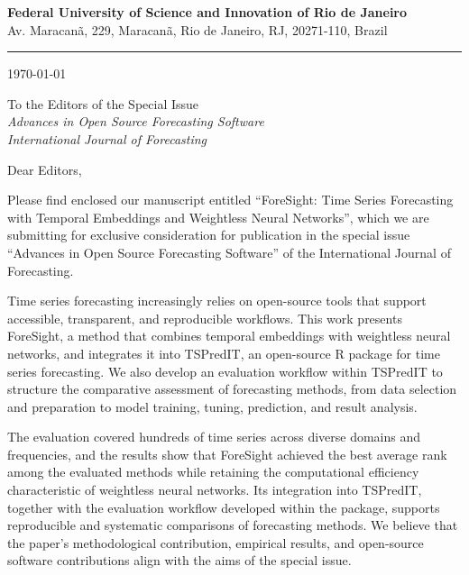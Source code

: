 \documentclass[11pt,a4paper]{article}
\begin{document}
\begin{center}
    {\large\bfseries Federal University of Science and Innovation of Rio de Janeiro}\\
    {\normalsize Av. Maracan\~a, 229, Maracan\~a, Rio de Janeiro, RJ, 20271-110, Brazil}
\end{center}
\vspace{-0.5em}
\noindent\rule{\linewidth}{0.8pt}

\vspace{1.0em}
\hfill \today

\vspace{1.0em}
\noindent To the Editors of the Special Issue\\
\noindent \emph{Advances in Open Source Forecasting Software}\\
\noindent \emph{International Journal of Forecasting}

\vspace{1.0em}

\noindent Dear Editors,

\noindent Please find enclosed our manuscript entitled ``ForeSight: Time Series Forecasting with Temporal Embeddings and Weightless Neural Networks'', which we are submitting for exclusive consideration for publication in the special issue ``Advances in Open Source Forecasting Software'' of the International Journal of Forecasting.

Time series forecasting increasingly relies on open-source tools that support accessible, transparent, and reproducible workflows. This work presents ForeSight, a method that combines temporal embeddings with weightless neural networks, and integrates it into TSPredIT, an open-source R package for time series forecasting. We also develop an evaluation workflow within TSPredIT to structure the comparative assessment of forecasting methods, from data selection and preparation to model training, tuning, prediction, and result analysis.

The evaluation covered hundreds of time series across diverse domains and frequencies, and the results show that ForeSight achieved the best average rank among the evaluated methods while retaining the computational efficiency characteristic of weightless neural networks. Its integration into TSPredIT, together with the evaluation workflow developed within the package, supports reproducible and systematic comparisons of forecasting methods. We believe that the paper's methodological contribution, empirical results, and open-source software contributions align with the aims of the special issue.
\end{document}
